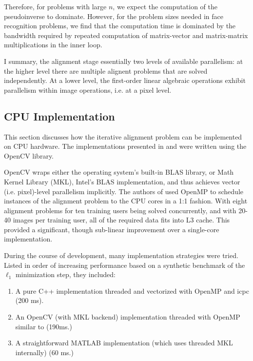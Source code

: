 \documentclass[10pt,twocolumn,letterpaper]{article}
\begin{document}
Therefore, for problems with large $n$, we expect the computation of the
pseudoinverse to dominate.  However, for the problem sizes needed in face
recognition problems, we find that the computation time is dominated by the
bandwidth required by repeated computation of matrix-vector and matrix-matrix
multiplications in the inner loop.

I summary, the alignment stage essentially two levels of available parallelism:
at the higher level there are multiple alignent problems that are solved
independently.  At a lower level, the first-order linear algebraic operations
exhibit parallelism within image operations, i.e. at a pixel level.

\subsection{CPU Implementation} 
\label{sec:alignment_implementation_cpu}

This section discusses how the iterative alignment problem can be implemented
on CPU hardware.  The implementations presented in \cite{WagnerA2009-CVPR} and
\cite{WagnerA2011-PAMI} were written using the OpenCV library.  

OpenCV wraps either the operating system's built-in BLAS library, or Math
Kernel Library (MKL), Intel's BLAS implementation, and thus achieves vector
(i.e. pixel)-level parallelism implicitly.  The authors of
\cite{WagnerA2011-PAMI} used OpenMP to schedule instances of the alignment
problem to the CPU cores in a 1:1 fashion.  With eight alignment problems for
ten training users being solved concurrently, and with 20-40 images per
training user, all of the required data fits into L3 cache.  This provided a
significant, though sub-linear improvement over a single-core implementation.

During the course of development, many implementation strategies were tried.
Listed in order of increasing performance based on a synthetic benchmark of
the $\ell_1$ minimization step, they included:
\begin{enumerate}
\item A pure C++ implementation threaded and vectorized with OpenMP and icpc (200 ms).
\item An OpenCV (with MKL backend) implementation threaded with OpenMP similar to \cite{WagnerA2011-PAMI} (190ms.)
\item A straightforward MATLAB implementation (which uses threaded MKL internally) (60 ms.)
\end{enumerate}
\end{document}
